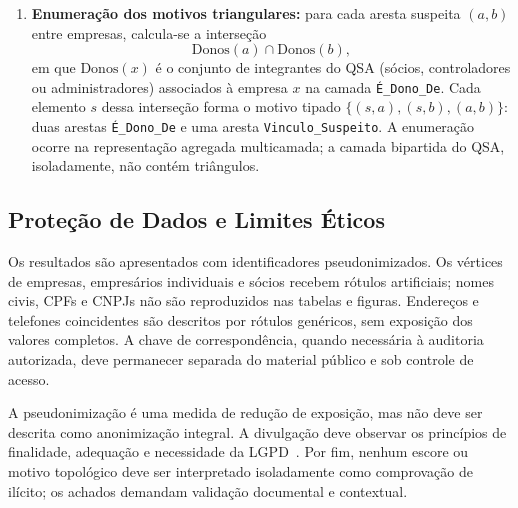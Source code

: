 \begin{enumerate}
  \item \textbf{Enumeração dos motivos triangulares:} para cada aresta suspeita $(a,b)$ entre empresas, calcula-se a interseção
  \begin{equation}
    \mathrm{Donos}(a)\cap\mathrm{Donos}(b),
  \end{equation}
  em que $\mathrm{Donos}(x)$ é o conjunto de integrantes do QSA (sócios, controladores ou administradores) associados à empresa $x$ na camada \texttt{É\_Dono\_De}. Cada elemento $s$ dessa interseção forma o motivo tipado $\{(s,a),(s,b),(a,b)\}$: duas arestas \texttt{É\_Dono\_De} e uma aresta \texttt{Vinculo\_Suspeito}. A enumeração ocorre na representação agregada multicamada; a camada bipartida do QSA, isoladamente, não contém triângulos.
\end{enumerate}

\subsection{Proteção de Dados e Limites Éticos}

Os resultados são apresentados com identificadores pseudonimizados. Os vértices de empresas, empresários individuais e sócios recebem rótulos artificiais; nomes civis, CPFs e CNPJs não são reproduzidos nas tabelas e figuras. Endereços e telefones coincidentes são descritos por rótulos genéricos, sem exposição dos valores completos. A chave de correspondência, quando necessária à auditoria autorizada, deve permanecer separada do material público e sob controle de acesso.

A pseudonimização é uma medida de redução de exposição, mas não deve ser descrita como anonimização integral. A divulgação deve observar os princípios de finalidade, adequação e necessidade da LGPD~\cite{brasil2018lgpd}. Por fim, nenhum escore ou motivo topológico deve ser interpretado isoladamente como comprovação de ilícito; os achados demandam validação documental e contextual.
